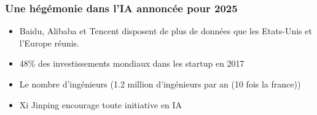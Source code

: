 \begin{frame}
\end{frame}

\begin{frame}
  \frametitle{Une hégémonie dans l'IA annoncée pour 2025}
  \begin{itemize}
  \item Baidu, Alibaba et Tencent disposent de plus de données que les Etats-Unis et l’Europe réunis.
  \item 48\% des investissements mondiaux dans les startup en 2017
  \item Le nombre d'ingénieurs (1.2 million d'ingénieurs par an (10 fois la france))
  \item Xi Jinping encourage toute initiative en IA
  \end{itemize}
\end{frame}

